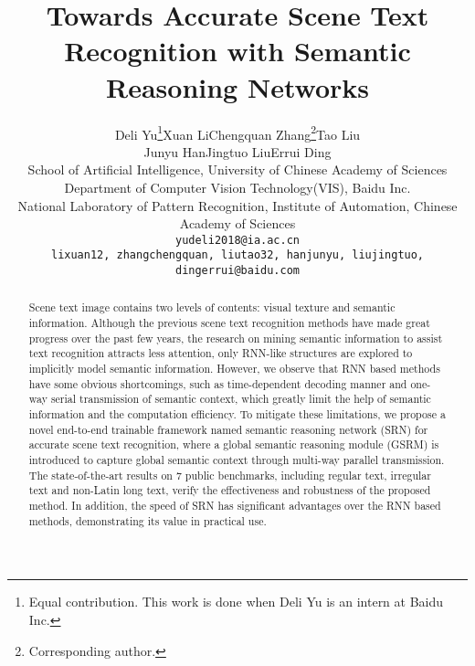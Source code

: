 \documentclass[10pt,twocolumn,letterpaper]{article}
\begin{document}
\begin{CJK}{UTF8}{gbsn}

\title{Towards Accurate Scene Text Recognition with Semantic Reasoning Networks}

\author{Deli Yu\thanks{Equal contribution. This work is done when Deli Yu is an intern at Baidu Inc.}\quad Xuan Li\quad Chengquan Zhang\thanks{Corresponding author.}\quad Tao Liu\\
\quad Junyu Han\quad Jingtuo Liu\quad Errui Ding\\
School of Artificial Intelligence, University of Chinese Academy of Sciences \\
Department of Computer Vision Technology(VIS), Baidu Inc.\\
National Laboratory of Pattern Recognition, Institute of Automation, Chinese Academy of Sciences\\
{\tt\small yudeli2018@ia.ac.cn}\\
{\tt\small lixuan12, zhangchengquan, liutao32, hanjunyu, liujingtuo, dingerrui@baidu.com}
}








\maketitle

\begin{abstract}
Scene text image contains two levels of contents: visual texture and semantic information.
Although the previous scene text recognition methods have made great progress over the past few years, the research on mining semantic information to assist text recognition attracts less attention, only RNN-like structures are explored to implicitly model semantic information.
However, we observe that RNN based methods have some obvious shortcomings, such as time-dependent decoding manner and one-way serial transmission of semantic context, which greatly limit the help of semantic information and the computation efficiency.
To mitigate these limitations, we propose a novel end-to-end trainable framework named semantic reasoning network (SRN) for accurate scene text recognition, where a global semantic reasoning module (GSRM) is introduced to capture global semantic context through multi-way parallel transmission. 
The state-of-the-art results on 7 public benchmarks, including regular text, irregular text and non-Latin long text, verify the effectiveness and robustness of the proposed method. 
In addition, the speed of SRN has significant advantages over the RNN based methods, demonstrating its value in practical use.
\end{abstract}
\vspace{-2mm}


\end{CJK}
\end{document}
